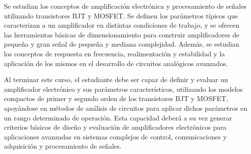 \documentclass[11pt,oneside,letterpaper]{article}
\begin{document}
\newpage
{}
%
Se estudian los conceptos de amplificación electrónica y procesamiento de señales utilizando transistores BJT y MOSFET. Se definen los parámetros típicos que caracterizan a un amplificador en distintas condiciones de trabajo, y se ofrecen las herramientas básicas de dimensionamiento para construir amplificadores de pequeña y gran señal de pequeña y mediana complejidad. Además, se estudian los conceptos de respuesta en frecuencia, realimentación y estabilidad y la aplicación de los mismos en el desarrollo de circuitos analógicos avanzados.


%
Al terminar este curso, el estudiante debe ser capaz de definir y evaluar un amplificador electrónico y sus parámetros característicos, utilizando los modelos compactos de primer y segundo orden de los transistores BJT y MOSFET, apoyándose en métodos de análisis de circuitos para aplicar dichos parámetros en un rango determinado de operación. Esta capacidad deberá a su vez generar criterios básicos de diseño y evaluación de amplificadores electrónicos para aplicaciones avanzadas en sistemas complejos de control, comunicaciones y adquisición y procesamiento de señales.
\end{document}
